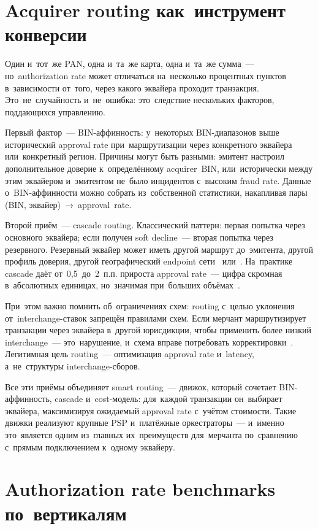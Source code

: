 \section{Acquirer routing как~инструмент конверсии}
\label{sec:decline-routing}

Один и~тот~же PAN, одна и~та~же карта, одна и~та~же сумма~--- но~authorization
rate может отличаться на~несколько процентных пунктов в~зависимости
от~того, через какого эквайера проходит транзакция. Это~не~случайность
и~не~ошибка: это~следствие нескольких факторов, поддающихся управлению.

Первый фактор~--- BIN-аффинность: у~некоторых BIN-диапазонов выше исторический
approval rate при~маршрутизации через конкретного эквайера или~конкретный
регион. Причины могут быть разными: эмитент настроил дополнительное
доверие к~определённому acquirer~BIN, или~исторически между этим эквайером
и~эмитентом не~было инцидентов с~высоким fraud rate. Данные о~BIN-аффинности
можно собрать из~собственной статистики, накапливая пары
(BIN, эквайер)~→~approval~rate.

Второй приём~--- cascade routing. Классический паттерн: первая попытка через
основного эквайера; если получен soft decline~--- вторая попытка через
резервного. Резервный эквайер может иметь другой маршрут до~эмитента,
другой профиль доверия, другой географический endpoint сети~
или~. На~практике cascade даёт от~0,5~до~2~п.п.
прироста approval rate~--- цифра скромная в~абсолютных единицах, но~значимая
при~больших объёмах~.

При~этом важно помнить об~ограничениях схем: routing с~целью уклонения
от~interchange-ставок запрещён правилами схем. Если мерчант маршрутизирует
транзакции через эквайера в~другой юрисдикции, чтобы применить более
низкий interchange~--- это~нарушение, и~схема вправе потребовать
корректировки~. Легитимная
цель routing~--- оптимизация approval rate и~latency, а~не~структуры
interchange-сборов.

Все эти приёмы объединяет smart routing~--- движок, который сочетает BIN-аффинность, cascade и~cost-модель:
для~каждой транзакции он~выбирает эквайера, максимизируя
ожидаемый approval rate с~учётом стоимости. Такие движки реализуют
крупные PSP и~платёжные оркестраторы~--- и~именно это~является одним
из~главных их~преимуществ для~мерчанта по~сравнению с~прямым подключением
к~одному эквайеру.


\section{Authorization rate benchmarks по~вертикалям}
\label{sec:decline-benchmarks}

